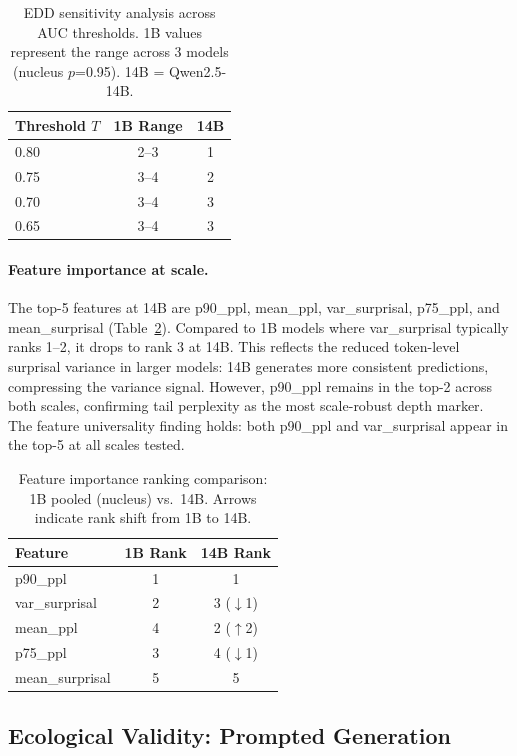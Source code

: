 \documentclass[11pt,a4paper]{article}
\begin{document}
\begin{table}[t]
\centering
\caption{EDD sensitivity analysis across AUC thresholds. 1B values represent the range across 3 models (nucleus $p$=0.95). 14B = Qwen2.5-14B.}
\label{tab:edd-sensitivity}
\begin{tabular}{lcc}
\toprule
\textbf{Threshold $T$} & \textbf{1B Range} & \textbf{14B} \\
\midrule
0.80 & 2--3 & 1 \\
0.75 & 3--4 & 2 \\
0.70 & 3--4 & 3 \\
0.65 & 3--4 & 3 \\
\bottomrule
\end{tabular}
\end{table}

\paragraph{Feature importance at scale.} The top-5 features at 14B are p90\_ppl, mean\_ppl, var\_surprisal, p75\_ppl, and mean\_surprisal (Table~\ref{tab:feature-rank}). Compared to 1B models where var\_surprisal typically ranks 1--2, it drops to rank 3 at 14B. This reflects the reduced token-level surprisal variance in larger models: 14B generates more consistent predictions, compressing the variance signal. However, p90\_ppl remains in the top-2 across both scales, confirming tail perplexity as the most scale-robust depth marker. The feature universality finding holds: both p90\_ppl and var\_surprisal appear in the top-5 at all scales tested.

\begin{table}[t]
\centering
\caption{Feature importance ranking comparison: 1B pooled (nucleus) vs.\ 14B. Arrows indicate rank shift from 1B to 14B.}
\label{tab:feature-rank}
\begin{tabular}{lcc}
\toprule
\textbf{Feature} & \textbf{1B Rank} & \textbf{14B Rank} \\
\midrule
p90\_ppl & 1 & 1 \\
var\_surprisal & 2 & 3 ($\downarrow$1) \\
mean\_ppl & 4 & 2 ($\uparrow$2) \\
p75\_ppl & 3 & 4 ($\downarrow$1) \\
mean\_surprisal & 5 & 5 \\
\bottomrule
\end{tabular}
\end{table}

\subsection{Ecological Validity: Prompted Generation}
\label{sec:prompted}
\end{document}
